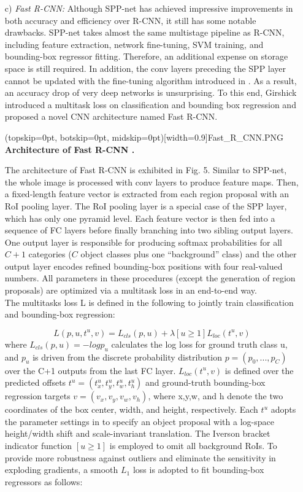 \documentclass[two column]{ieeeaccess}
\begin{document}
\begin{itemize}
    
    \item[c)]\textit{Fast R-CNN: } Although SPP-net has achieved impressive improvements in both accuracy and efficiency over R-CNN, it still has some notable drawbacks. SPP-net takes almost the same multistage pipeline as R-CNN, including feature extraction, network fine-tuning, SVM training, and bounding-box regressor fitting. Therefore, an additional expense on storage space is still required. In addition, the conv layers preceding the SPP layer cannot be updated with the fine-tuning algorithm introduced in \cite{64}. As a result, an accuracy drop of very deep networks is unsurprising. To this end, Girshick \cite{16} introduced a multitask loss on classification and bounding box regression and proposed a novel CNN architecture named Fast R-CNN.
    
    \Figure[ht](topskip=0pt, botskip=0pt, midskip=0pt)[width=0.9\linewidth]{Fast_R_CNN.PNG} {\textbf{Architecture of Fast R-CNN \cite{16}.}\label{fig5}}
    
    The architecture of Fast R-CNN is exhibited in Fig. 5. Similar to SPP-net, the whole image is processed with conv layers to produce feature maps. Then, a fixed-length feature vector is extracted from each region proposal with an RoI pooling layer. The RoI pooling layer is a special case of the SPP layer, which has only one pyramid level. Each feature vector is then fed into a sequence of FC layers before finally branching into two sibling output layers. One output layer is responsible for producing softmax probabilities for all $C + 1$ categories ($C$ object classes plus one “background” class) and the other output layer encodes refined bounding-box positions with four real-valued numbers. All parameters in these procedures (except the generation of region proposals) are optimized via a multitask loss in an end-to-end way.\\
    
    The multitasks loss L is defined in the following to jointly train classification and bounding-box regression:
    
    \begin{equation}
    \label{eqn1}
    L(p,u,t^u,v) = L_{cls}(p,u) + \lambda[u \geq 1]L_{loc}(t^u,v)
    \end{equation}
%
    where \(L_{cls}(p, u)= -log p_u\) calculates the log loss for ground truth class u, and $p_u$ is driven from the discrete probability distribution \(p = (p_0,. . ., p_C)\) over the C+1 outputs from the last FC layer. \(L_{loc}(t^u, v)\) is defined over the predicted offsets \(t^u = (t^u_x , t^u_y , t^u_w, t^u_h)\) and ground-truth bounding-box  regression targets \(v = (v_x, v_y, v_w, v_h)\), where x,y,w, and h denote the two coordinates of the box center, width, and height, respectively. Each $t^u$ adopts the parameter settings in \cite{15} to specify an object proposal with a log-space height/width shift and scale-invariant translation. The Iverson bracket indicator function $[u \geq 1]$ is employed to omit all background RoIs. To provide more robustness against outliers and eliminate the sensitivity in exploding gradients, a smooth $L_1$ loss is adopted to fit bounding-box regressors as follows:
    

\end{itemize}
\end{document}

